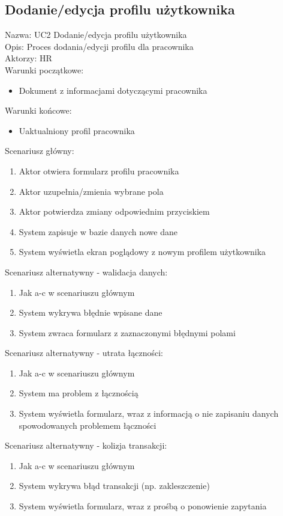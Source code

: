 \subsection{Dodanie/edycja profilu użytkownika}
\begin{adjustwidth}{5em}{0pt}
Nazwa: UC2 Dodanie/edycja profilu użytkownika \\
Opis: Proces dodania/edycji profilu dla pracownika \\
Aktorzy: HR \\
Warunki początkowe:
\begin{itemize}
\item Dokument z informacjami dotyczącymi pracownika
\end{itemize}
Warunki końcowe: 
\begin{itemize}
\item Uaktualniony profil pracownika
\end{itemize}
Scenariusz główny:
\begin{enumerate}
\item Aktor otwiera formularz profilu pracownika
\item Aktor uzupełnia/zmienia wybrane pola
\item Aktor potwierdza zmiany odpowiednim przyciskiem
\item System zapisuje w bazie danych nowe dane
\item System wyświetla ekran poglądowy z nowym profilem użytkownika
\end{enumerate}
Scenariusz alternatywny - walidacja danych: 
\begin{enumerate}
\item Jak a-c w scenariuszu głównym
\item System wykrywa błędnie wpisane dane 
\item System zwraca formularz z zaznaczonymi błędnymi polami
\end{enumerate}
Scenariusz alternatywny - utrata łączności: 
\begin{enumerate}
\item Jak a-c w scenariuszu głównym
\item System ma problem z łącznością 
\item System wyświetla formularz, wraz z informacją o nie zapisaniu danych spowodowanych problemem łączności
\end{enumerate}
Scenariusz alternatywny - kolizja transakcji: 
\begin{enumerate}
\item Jak a-c w scenariuszu głównym
\item System wykrywa błąd transakcji (np. zakleszczenie)
\item System wyświetla formularz, wraz z prośbą o ponowienie zapytania
\end{enumerate}
\end{adjustwidth}

